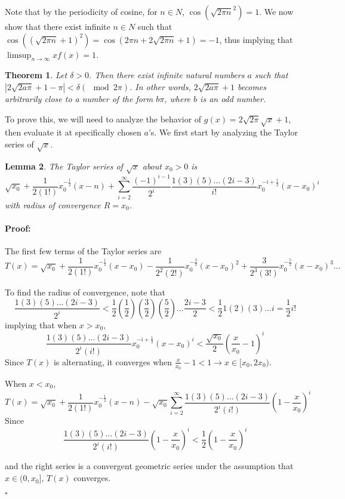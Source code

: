 \documentclass{article}
\newenvironment{proof}{\paragraph{Proof:}}{\hfill$\square$}
\newtheorem{theorem}{Theorem}
\newtheorem{lemma}[theorem]{Lemma}
\begin{document}
Note that by the periodicity of cosine, for $n \in N$, $\cos(\sqrt{2\pi n}^2) = 1$. We now show that there exist infinite $n \in N$ such that $\cos((\sqrt{2\pi n}+1)^2) = \cos(2\pi n + 2\sqrt{2 \pi n} + 1) = -1$, thus implying that $\limsup_{n\rightarrow\infty} xf(x) = 1$.

\begin{theorem}
\label{NearCosine}
Let $\delta > 0$. Then there exist infinite natural numbers $a$ such that $|2\sqrt{2a\pi} + 1 - \pi| < \delta \left(\mod 2\pi \right)$. In other words, $2\sqrt{2a\pi} + 1$ becomes arbitrarily close to a number of the form $b\pi$, where $b$ is an odd number.
\end{theorem}

To prove this, we will need to analyze the behavior of $g(x) = 2\sqrt{2\pi}\sqrt{x} + 1$, then evaluate it at specifically chosen $a$'s. We first start by analyzing the Taylor series of $\sqrt{x}$.

\begin{lemma}
\label{SquareRootTaylorSeries}
The Taylor series of $\sqrt{x}$ about $x_0>0$ is
\[
\sqrt{x_0} + \frac{1}{2(1!)} x_0^{-\frac{1}{2}}(x-n) + \sum_{i=2}^{\infty} \frac{(-1)^{i-1}}{2^i} \frac{1(3)(5)...(2i-3)}{i!} x_0^{-i + \frac{1}{2}}(x-x_0)^i
\]
with radius of convergence $R = x_0$.
\end{lemma}

\begin{proof}
The first few terms of the Taylor series are
\[
T(x) = \sqrt{x_0} + \frac{1}{2(1!)} x_0^{-\frac{1}{2}}(x-x_0)
- \frac{1}{2^2(2!)} x_0^{-\frac{3}{2}}(x-x_0)^2
+ \frac{3}{2^3(3!)} x_0^{-\frac{5}{2}}(x-x_0)^3 \dots
\]

To find the radius of convergence, note that
\[
\frac{1(3)(5)...(2i-3)}{2^i}
< \frac{1}{2} \left(\frac{1}{2}\right)
\left(\frac{3}{2}\right)\left(\frac{5}{2}\right)\dots \frac{2i-3}{2} 
< \frac{1}{2} 1(2)(3)\dots i
= \frac{1}{2} i!
\]
implying that when $x > x_0$,
\[
\frac{1(3)(5)...(2i-3)}{2^i(i!)} x_0^{-i + \frac{1}{2}}(x-x_0)^i
< \frac{\sqrt{x_0}}{2}\left(\frac{x}{x_0}-1\right)^i
\]
Since $T(x)$ is alternating, it converges when $\frac{x}{x_0} - 1 < 1 \rightarrow x \in [x_0, 2x_0)$.

When $x < x_0$,
\[
T(x) = \sqrt{x_0} + \frac{1}{2(1!)} x_0^{-\frac{1}{2}}(x-n) 
- \sqrt{x_0}\sum_{i=2}^{\infty} \frac{1(3)(5)...(2i-3)}{2^i(i!)} \left(1 - \frac{x}{x_0}\right)^i
\]
Since
\[
\frac{1(3)(5)...(2i-3)}{2^i(i!)} \left(1 - \frac{x}{x_0}\right)^i
< \frac{1}{2}\left(1 - \frac{x}{x_0}\right)^i
\]

and the right series is a convergent geometric series under the assumption that $x \in (0, x_0]$, $T(x)$ converges.

\end{proof}
\end{document}
